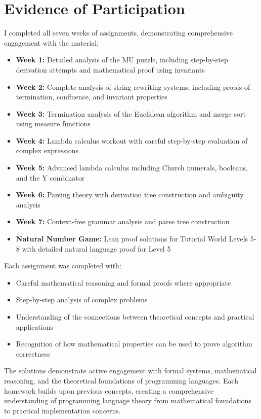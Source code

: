 \documentclass{article}
\theoremstyle{plain}
\theoremstyle{definition}
\theoremstyle{remark}
\begin{document}
\section{Evidence of Participation}

I completed all seven weeks of assignments, demonstrating comprehensive engagement with the material:

\begin{itemize}
\item \textbf{Week 1:} Detailed analysis of the MU puzzle, including step-by-step derivation attempts and mathematical proof using invariants
\item \textbf{Week 2:} Complete analysis of string rewriting systems, including proofs of termination, confluence, and invariant properties
\item \textbf{Week 3:} Termination analysis of the Euclidean algorithm and merge sort using measure functions
\item \textbf{Week 4:} Lambda calculus workout with careful step-by-step evaluation of complex expressions
\item \textbf{Week 5:} Advanced lambda calculus including Church numerals, booleans, and the Y combinator
\item \textbf{Week 6:} Parsing theory with derivation tree construction and ambiguity analysis
\item \textbf{Week 7:} Context-free grammar analysis and parse tree construction
\item \textbf{Natural Number Game:} Lean proof solutions for Tutorial World Levels 5-8 with detailed natural language proof for Level 5
\end{itemize}

Each assignment was completed with:
\begin{itemize}
\item Careful mathematical reasoning and formal proofs where appropriate
\item Step-by-step analysis of complex problems
\item Understanding of the connections between theoretical concepts and practical applications
\item Recognition of how mathematical properties can be used to prove algorithm correctness
\end{itemize}

The solutions demonstrate active engagement with formal systems, mathematical reasoning, and the theoretical foundations of programming languages. Each homework builds upon previous concepts, creating a comprehensive understanding of programming language theory from mathematical foundations to practical implementation concerns.
\end{document}

